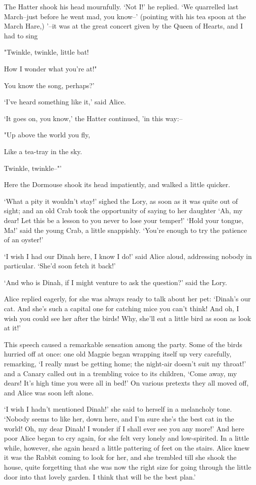 \documentclass[statementpaper,twoside,openany]{memoir}
\begin{document}
The Hatter shook his head mournfully. `Not I!' he replied. `We quarrelled last March--just before he went mad, you know--' (pointing with his tea spoon at the March Hare,) '--it was at the great concert given by the Queen of Hearts, and I had to sing

"Twinkle, twinkle, little bat!

How I wonder what you're at!"

You know the song, perhaps?'

`I've heard something like it,' said Alice.

`It goes on, you know,' the Hatter continued, 'in this way:--

"Up above the world you fly,

Like a tea-tray in the sky.

Twinkle, twinkle--"'

Here the Dormouse shook its head impatiently, and walked a little quicker.

`What a pity it wouldn't stay!' sighed the Lory, as soon as it was quite out of sight; and an old Crab took the opportunity of saying to her daughter `Ah, my dear! Let this be a lesson to you never to lose your temper!' `Hold your tongue, Ma!' said the young Crab, a little snappishly. `You're enough to try the patience of an oyster!'

`I wish I had our Dinah here, I know I do!' said Alice aloud, addressing nobody in particular. `She'd soon fetch it back!'

`And who is Dinah, if I might venture to ask the question?' said the Lory.

Alice replied eagerly, for she was always ready to talk about her pet: `Dinah's our cat. And she's such a capital one for catching mice you can't think! And oh, I wish you could see her after the birds! Why, she'll eat a little bird as soon as look at it!'

This speech caused a remarkable sensation among the party. Some of the birds hurried off at once: one old Magpie began wrapping itself up very carefully, remarking, `I really must be getting home; the night-air doesn't suit my throat!' and a Canary called out in a trembling voice to its children, `Come away, my dears! It's high time you were all in bed!' On various pretexts they all moved off, and Alice was soon left alone.

`I wish I hadn't mentioned Dinah!' she said to herself in a melancholy tone. `Nobody seems to like her, down here, and I'm sure she's the best cat in the world! Oh, my dear Dinah! I wonder if I shall ever see you any more!' And here poor Alice began to cry again, for she felt very lonely and low-spirited. In a little while, however, she again heard a little pattering of feet on the stairs. Alice knew it was the Rabbit coming to look for her, and she trembled till she shook the house, quite forgetting that she was now the right size for going through the little door into that lovely garden. I think that will be the best plan.'
\end{document}
